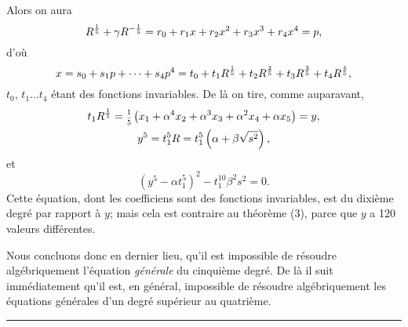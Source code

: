 \documentclass[oneside, 12 pt, leqno]{memoir}
\let\oldfrac\frac
\def\frac#1#2{\mathchoice{\text{\scalebox{.83}{${\oldfrac{#1}{#2}}$}}}{\text{\scalebox{.83}{${\displaystyle\oldfrac{#1}{#2}}$}}}{\genfrac{}{}{}{2}{#1}{#2}}{\genfrac{}{}{}{3}{#1}{#2}}}
\begin{document}
Alors on aura
\[R^{\frac{1}{5}}+\gamma R^{-\frac{1}{5}}=r_0+r_1 x+r_2 x^2+r_3 x^3+r_4 x^4=p,\]
d'où
\[x=s_0+s_1 p+\dots+s_4 p^4=t_0+t_1 R^{\frac{1}{5}}+t_2 R^{\frac{2}{5}}+t_3 R^{\frac{3}{5}}+t_4 R^{\frac{4}{5}},\]
\(t_0\), \(t_1 \dots t_4\) étant des fonctions invariables. De là on tire, comme auparavant,
\[\begin{gathered}
t_1 R^{\frac{1}{5}}=\frac{1}{5}\left(x_1+\alpha^4 x_2+\alpha^3 x_3+\alpha^2 x_4+\alpha x_5\right)=y, \\
y^5=t_1^5 R=t_1^5\left(\alpha+\beta \sqrt{s^2}\right),
\end{gathered}\]
et
\[\left(y^5-\alpha t_1^5\right)^2-t_1^{10} \beta^2 s^2=0.\]
Cette équation, dont les coefficiens sont des fonctions invariables, est du dixième degré par rapport à \(y\); mais cela est contraire au théorème (3), parce que \(y\) a 120 valeurs différentes.

Nous concluons donc en dernier lieu, qu’il est impossible de résoudre algébriquement l'équation \textit{générale} du cinquième degré. De là il suit immédiatement qu’il est, en général, impossible de résoudre algébriquement les équations générales d'un degré supérieur au quatrième.
\begin{center}\rule{2in}{0.1pt}\end{center}
\end{document}
